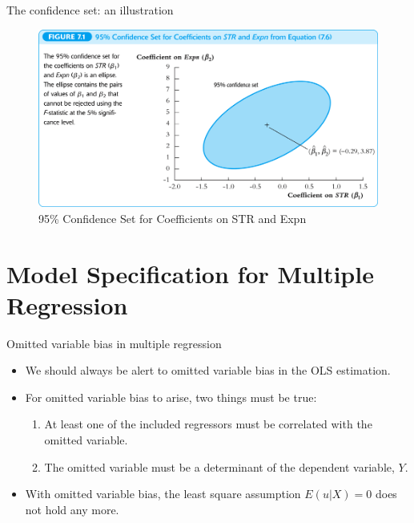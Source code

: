 \documentclass[presentation,10pt]{beamer}
\begin{document}
\begin{frame}[label={sec:org941fe2d}]{The confidence set: an illustration}
\begin{figure}[htbp]
\centering
\includegraphics[width=.9\linewidth]{img/fig-7-1.png}
\caption{\label{fig:orgc2e52f5}
95\% Confidence Set for Coefficients on STR and Expn}
\end{figure}
\end{frame}

\section{Model Specification for Multiple Regression}
\label{sec:org253b2aa}
\setcounter{tocdepth}{1}
\tableofcontents[currentsection]
\begin{frame}[label={sec:org2b72b3d}]{Omitted variable bias in multiple regression}
\begin{itemize}
\item We should always be alert to omitted variable bias in the OLS
estimation.

\item For omitted variable bias to arise, two things must be true:
\begin{enumerate}
\item At least one of the included regressors must be correlated with the
omitted variable.
\item The omitted variable must be a determinant of the dependent
variable, \(Y\).
\end{enumerate}

\item With omitted variable bias, the least square assumption \(E(u|X) = 0\)
does not hold any more.
\end{itemize}
\end{frame}
\end{document}
